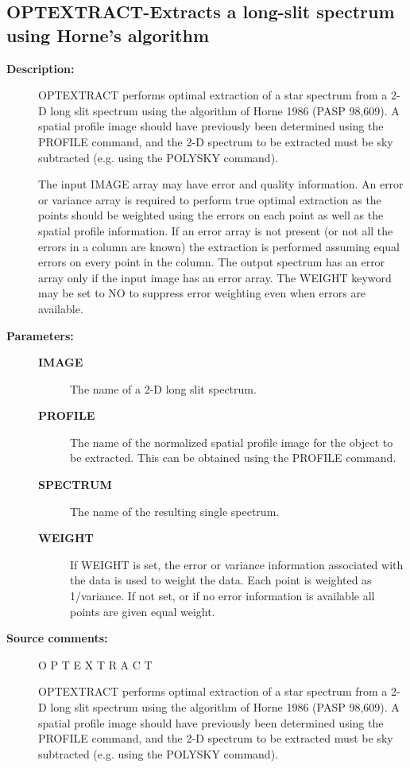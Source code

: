\begin{description}
\subsection{OPTEXTRACT-\label{OPTEXTRACT}Extracts a long-slit spectrum using Horne's algorithm}
\begin{description}

\item [\textbf{Description:}]
 OPTEXTRACT performs optimal extraction of a star spectrum from a
 2-D long slit spectrum using the algorithm of Horne 1986 (PASP
 98,609).  A spatial profile image should have previously been
 determined using the PROFILE command, and the 2-D spectrum to be
 extracted must be sky subtracted (e.g. using the POLYSKY command).

 The input IMAGE array may have error and quality information.
 An error or variance array is required to perform true optimal
 extraction as the points should be weighted using the errors on
 each point as well as the spatial profile information. If an error
 array is not present (or not all the errors in a column are known)
 the extraction is performed assuming equal errors on every point
 in the column. The output spectrum has an error array only if the
 input image has an error array. The WEIGHT keyword may be set to NO
 to suppress error weighting even when errors are available.

\item [\textbf{Parameters:}]
\begin{description}
\item [\textbf{IMAGE}]
 The name of a 2-D long slit spectrum.
\item [\textbf{PROFILE}]
 The name of the normalized spatial profile image for
 the object to be extracted. This can be obtained
 using the PROFILE command.
\item [\textbf{SPECTRUM}]
 The name of the resulting single spectrum.
\item [\textbf{WEIGHT}]
 If WEIGHT is set, the error or variance information
 associated with the data is used to weight the data.
 Each point is weighted as 1/variance. If not set, or
 if no error information is available all points are
 given equal weight.
\end{description}

\item [\textbf{Source comments:}]
\begin{terminalv}
 O P T E X T R A C T

 OPTEXTRACT performs optimal extraction of a star spectrum from a
 2-D long slit spectrum using the algorithm of Horne 1986 (PASP 98,609).
 A spatial profile image should have previously been determined using
 the PROFILE command, and the 2-D spectrum to be extracted must be
 sky subtracted (e.g. using the POLYSKY command).


\end{terminalv}
\end{description}
\end{description}

